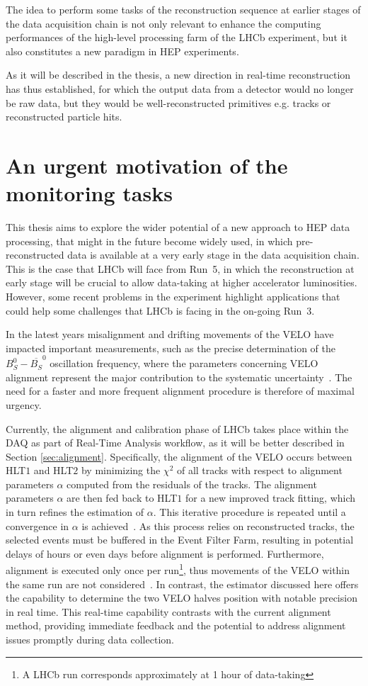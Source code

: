 The idea to perform some tasks of the reconstruction sequence at earlier stages of the data acquisition chain is not only relevant to enhance the computing performances of the high-level processing farm of the LHCb experiment, but it also constitutes a new paradigm in HEP experiments. 

As it will be described in the thesis, a new direction in real-time reconstruction has thus established, for which the output data from a detector would no longer be raw data, but they would be well-reconstructed primitives e.g. tracks or reconstructed particle hits.
 

\section{An urgent motivation of the monitoring tasks}
This thesis aims to explore the wider potential of a new approach to HEP data processing, that might in the future become widely used, in which pre-reconstructed data is available at a very early stage in the data acquisition chain. This is the case that LHCb will face from Run~5, in which the reconstruction at early stage will be crucial to allow data-taking at higher accelerator luminosities. However, some recent problems in the experiment highlight applications that could help some challenges that LHCb is facing in the on-going Run~3.


In the latest years misalignment and drifting movements of the VELO have impacted important measurements, such as the precise determination of the $B_S^0-\overline{B_S} ^0$ oscillation frequency, where the parameters concerning VELO alignment represent the major contribution to the systematic uncertainty~\cite{b0b0soscillation}. The need for a faster and more frequent alignment procedure is therefore of maximal urgency.  
    
Currently, the alignment and calibration phase of LHCb takes place within the DAQ as part of Real-Time Analysis workflow, as it will be better described in Section \ref{sec:alignment}. Specifically, the alignment of the VELO occurs between HLT$1$ and HLT$2$ by minimizing the $\chi^2$ of all tracks with respect to alignment parameters $\alpha$ computed from the residuals of the tracks. The alignment parameters $\alpha$ are then fed back to HLT$1$ for a new improved track fitting, which in turn refines the estimation of $\alpha$. This iterative procedure is repeated until a convergence in $\alpha$ is achieved~\cite{FRUHWIRTH1987444, Frühwirth:803519}. As this process relies on reconstructed tracks, the selected events must be buffered in the Event Filter Farm, resulting in potential delays of hours or even days before alignment is performed. Furthermore, alignment is executed only once per run\footnote{A LHCb run corresponds approximately at 1 hour of data-taking}, thus movements of the VELO within the same run are not considered~\cite{Dziurda:2640712}. In contrast, the estimator discussed here offers the capability to determine the two VELO halves position with notable precision in real time. This real-time capability contrasts with the current alignment method, providing immediate feedback and the potential to address alignment issues promptly during data collection.

